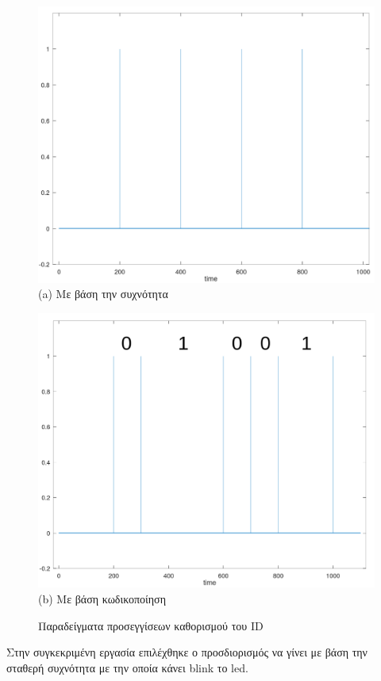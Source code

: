 \begin{figure} [H]
	\centering
    \begin{minipage}{.5\textwidth}
      \centering
      \includegraphics[width=0.9\linewidth]{../Images/Experiments-Results/freq-id.png}\\
      {(a) Mε βάση την συχνότητα}
    \end{minipage}%
    \begin{minipage}{.5\textwidth}
      \centering
      \includegraphics[width=.9\linewidth]{../Images/Experiments-Results/enco-id.png}\\
      {(b) Mε βάση κωδικοποίηση}
	  \end{minipage}
    \hfill \break
    \decoRule
    \caption[Παραδείγματα προσεγγίσεων καθορισμού του ID]{Παραδείγματα προσεγγίσεων καθορισμού του ID}%
    \label{fig:id-calc}
\end{figure}

Στην συγκεκριμένη εργασία επιλέχθηκε ο προσδιορισμός να γίνει με βάση την σταθερή συχνότητα με την οποία κάνει blink το led.


